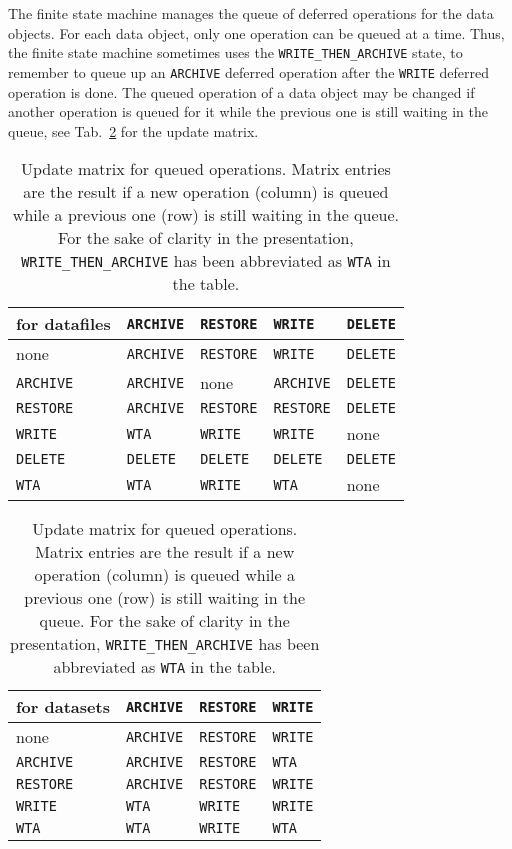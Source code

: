 \documentclass[paper=a4]{scrartcl}
\begin{document}
The finite state machine manages the queue of deferred operations for
the data objects.  For each data object, only one operation can be
queued at a time.  Thus, the finite state machine sometimes uses the
\texttt{WRITE\_THEN\_ARCHIVE} state, to remember to queue up an
\texttt{ARCHIVE} deferred operation after the \texttt{WRITE} deferred
operation is done.  The queued operation of a data object may be
changed if another operation is queued for it while the previous one
is still waiting in the queue, see Tab.\ \ref{tab:fsm} for the update
matrix.

\begin{table}
 \begin{tabular}{l|llll}
  for datafiles    & \texttt{ARCHIVE} & \texttt{RESTORE} & \texttt{WRITE}   & \texttt{DELETE} \\
  \hline
  none             & \texttt{ARCHIVE} & \texttt{RESTORE} & \texttt{WRITE}   & \texttt{DELETE} \\
  \texttt{ARCHIVE} & \texttt{ARCHIVE} & none             & \texttt{ARCHIVE} & \texttt{DELETE} \\
  \texttt{RESTORE} & \texttt{ARCHIVE} & \texttt{RESTORE} & \texttt{RESTORE} & \texttt{DELETE} \\
  \texttt{WRITE}   & \texttt{WTA}     & \texttt{WRITE}   & \texttt{WRITE}   & none \\
  \texttt{DELETE}  & \texttt{DELETE}  & \texttt{DELETE}  & \texttt{DELETE}  & \texttt{DELETE} \\
  \texttt{WTA}     & \texttt{WTA}     & \texttt{WRITE}   & \texttt{WTA}     & none \\
 \end{tabular}
 \bigbreak
 \begin{tabular}{l|lll}
  for datasets     & \texttt{ARCHIVE} & \texttt{RESTORE} & \texttt{WRITE} \\
  \hline
  none             & \texttt{ARCHIVE} & \texttt{RESTORE} & \texttt{WRITE} \\
  \texttt{ARCHIVE} & \texttt{ARCHIVE} & \texttt{RESTORE} & \texttt{WTA} \\
  \texttt{RESTORE} & \texttt{ARCHIVE} & \texttt{RESTORE} & \texttt{WRITE} \\
  \texttt{WRITE}   & \texttt{WTA}     & \texttt{WRITE}   & \texttt{WRITE} \\
  \texttt{WTA}     & \texttt{WTA}     & \texttt{WRITE}   & \texttt{WTA} \\
 \end{tabular}
 \caption{Update matrix for queued operations.  Matrix entries are the
   result if a new operation (column) is queued while a previous one
   (row) is still waiting in the queue.  For the sake of clarity in
   the presentation, \texttt{WRITE\_THEN\_ARCHIVE} has been
   abbreviated as \texttt{WTA} in the table.}
 \label{tab:fsm}
\end{table}
\end{document}
